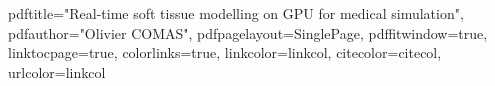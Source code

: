 \usepackage{color}


\hypersetup
{
pdftitle="Real-time soft tissue modelling on GPU for medical simulation", %
pdfauthor="Olivier COMAS", %
pdfpagelayout=SinglePage, %
pdffitwindow=true, %
linktocpage=true, %
colorlinks=true, %
linkcolor=linkcol, %
citecolor=citecol, %
urlcolor=linkcol %
}





\newcommand{\pd}[2]{\dfrac{\partial #1}{\partial #2}}

\newcommand{\fig}[1]{Fig.~\ref{#1}}

